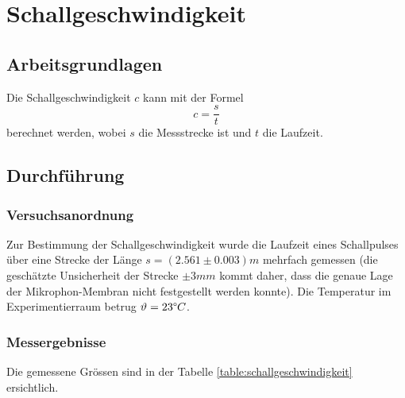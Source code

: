 \section{Schallgeschwindigkeit}

\subsection{Arbeitsgrundlagen}

Die Schallgeschwindigkeit $c$ kann mit der Formel
\begin{equation}
    c=\frac{s}{t}
    \label{eq:schallgeschwindigkeit}
\end{equation}
berechnet werden, wobei $s$ die Messstrecke ist und $t$ die Laufzeit.


\subsection{Durchf\"{u}hrung}

\subsubsection*{Versuchsanordnung}

Zur Bestimmung der Schallgeschwindigkeit wurde die Laufzeit eines Schallpulses \"{u}ber eine Strecke
der L\"{a}nge $s = (2.561 \pm 0.003) m$ mehrfach gemessen (die gesch\"{a}tzte Unsicherheit der Strecke $\pm 3 mm$
kommt daher, dass die genaue Lage der Mikrophon-Membran nicht festgestellt werden konnte). Die
Temperatur im Experimentierraum betrug $\vartheta=23 \degree C$.


\subsubsection*{Messergebnisse}

Die gemessene Gr\"ossen sind in der Tabelle \ref{table:schallgeschwindigkeit} ersichtlich.

